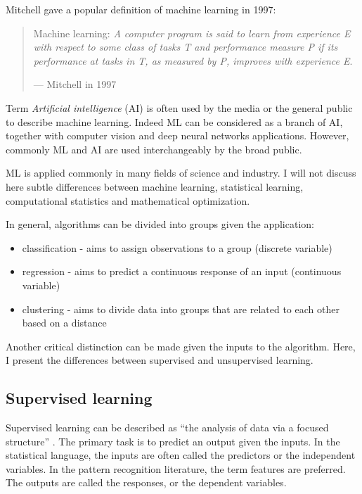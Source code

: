 \documentclass[12pt,]{book}
\providecommand{\tightlist}{%
  \setlength{\itemsep}{0pt}\setlength{\parskip}{0pt}}
\theoremstyle{definition}
\theoremstyle{definition}
\theoremstyle{definition}
\theoremstyle{remark}
\begin{document}
Mitchell gave a popular definition of machine learning in 1997:

\begin{quote}
Machine learning: \emph{A computer program is said to learn from
experience E with respect to some class of tasks T and performance
measure P if its performance at tasks in T, as measured by P, improves
with experience E}.

--- Mitchell in 1997 \citep{Mitchell1997}
\end{quote}

Term \emph{Artificial intelligence} (AI) is often used by the media or
the general public to describe machine learning. Indeed ML can be
considered as a branch of AI, together with computer vision and deep
neural networks applications. However, commonly ML and AI are used
interchangeably by the broad public.

ML is applied commonly in many fields of science and industry. I will
not discuss here subtle differences between machine learning,
statistical learning, computational statistics and mathematical
optimization.

In general, algorithms can be divided into groups given the application:

\begin{itemize}
\tightlist
\item
  classification - aims to assign observations to a group (discrete
  variable)
\item
  regression - aims to predict a continuous response of an input
  (continuous variable)
\item
  clustering - aims to divide data into groups that are related to each
  other based on a distance
\end{itemize}

Another critical distinction can be made given the inputs to the
algorithm. Here, I present the differences between supervised and
unsupervised learning.

\hypertarget{supervised-learning}{%
\subsection{Supervised learning}\label{supervised-learning}}

Supervised learning can be described as ``the analysis of data via a
focused structure'' \citep{Piegorsch}. The primary task is to predict an
output given the inputs. In the statistical language, the inputs are
often called the predictors or the independent variables. In the pattern
recognition literature, the term features are preferred. The outputs are
called the responses, or the dependent variables. \citep{Hastie2009}
\end{document}
